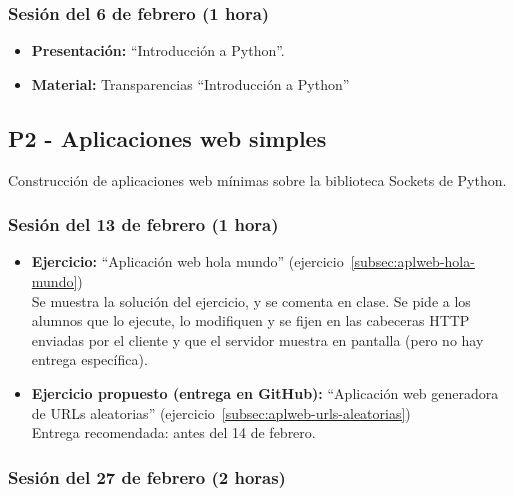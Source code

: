 \documentclass[a4paper,12pt]{article}
\begin{document}
\subsubsection{Sesión del 6 de febrero (1 hora)}

\begin{itemize}
\item \textbf{Presentación:} ``Introducción a Python''.
\item \textbf{Material:} Transparencias ``Introducción a Python''

\end{itemize}


\subsection{P2 - Aplicaciones web simples}

Construcción de aplicaciones web mínimas sobre la biblioteca Sockets de Python.

\subsubsection{Sesión del 13 de febrero (1 hora)}

\begin{itemize}
 \item \textbf{Ejercicio:} ``Aplicación web hola mundo'' (ejercicio~\ref{subsec:aplweb-hola-mundo}) \\
   Se muestra la solución del ejercicio, y se comenta en clase. Se pide a los alumnos que lo ejecute, lo modifiquen y se fijen en las cabeceras HTTP enviadas por el cliente y que el servidor muestra en pantalla (pero no hay entrega específica).
 \item \textbf{Ejercicio propuesto (entrega en GitHub):} ``Aplicación web generadora de URLs aleatorias'' (ejercicio~\ref{subsec:aplweb-urls-aleatorias}) \\
   Entrega recomendada: antes del 14 de febrero.
\end{itemize}

\subsubsection{Sesión del 27 de febrero (2 horas)}
\end{document}
